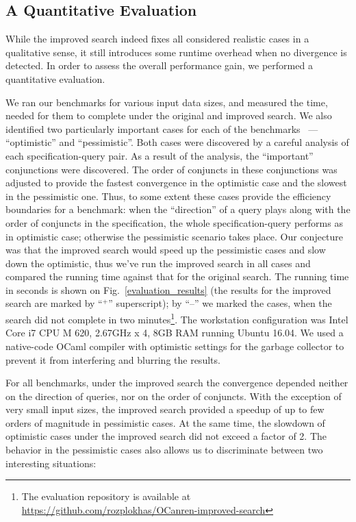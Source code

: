 \subsection{A Quantitative Evaluation}



While the improved search indeed fixes all considered realistic cases in a qualitative sense, it still introduces some runtime
overhead when no divergence is detected. In order to assess the overall performance gain, we performed a quantitative
evaluation.

We ran our benchmarks for various input data sizes, and measured the time, needed for them to complete under the original and
improved search. We also identified two particularly important cases for each of the benchmarks ~--- ``optimistic''
and ``pessimistic''. Both cases were discovered by a careful analysis of each specification-query pair. As a result of the
analysis, the ``important'' conjunctions were discovered. The order of conjuncts in these conjunctions was adjusted to provide
the fastest convergence in the optimistic case and the slowest in the pessimistic one. Thus, to some extent these
cases provide the efficiency boundaries for a benchmark: when the ``direction'' of a query plays along with the
order of conjuncts in the specification, the whole specification-query performs as in optimistic case; otherwise
the pessimistic scenario takes place. Our conjecture was that the improved search would speed up the pessimistic
cases and slow down the optimistic, thus we've run the improved search in all cases and compared the running time
against that for the original search. The running time in seconds is shown on Fig.~\ref{evaluation_results} (the results
for the improved search are marked by ``$^+$'' superscript); by ``--'' we marked the cases, when the search did not
complete in two minutes\footnote{The evaluation repository is available at \url{https://github.com/rozplokhas/OCanren-improved-search}}.
The workstation configuration was Intel Core i7 CPU M 620, 2.67GHz x 4, 8GB RAM running Ubuntu 16.04. We used a
native-code OCaml compiler with optimistic settings for the garbage collector to prevent it from interfering and blurring the
results.

For all benchmarks, under the improved search the convergence depended neither on the direction of queries, nor on the
order of conjuncts. With the exception of very small input sizes, the improved search provided a speedup of up to
few orders of magnitude in pessimistic cases. At the same time, the slowdown of optimistic cases under
the improved search did not exceed a factor of 2. The behavior in the pessimistic cases also allows us to discriminate
between two interesting situations:

